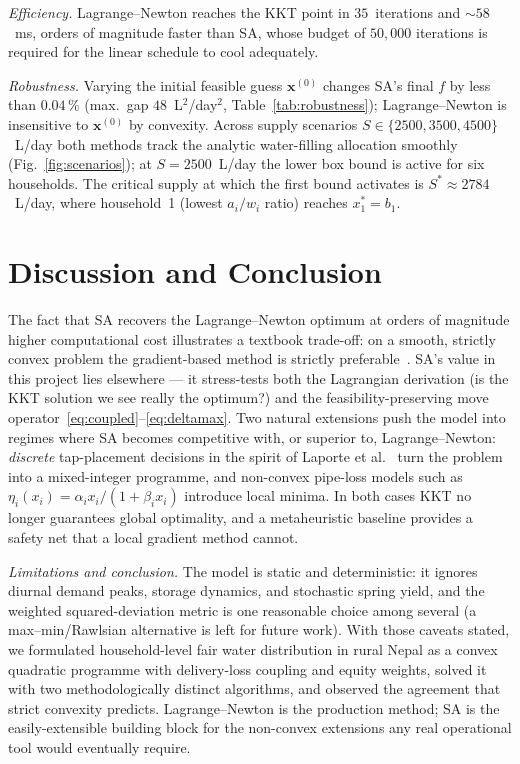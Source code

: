 \emph{Efficiency.}
Lagrange--Newton reaches the KKT point in $35$~iterations
and ${\sim}58$~\si{\milli\second}, orders of magnitude faster
than SA, whose budget of $50{,}000$ iterations is required for
the linear schedule to cool adequately.

\emph{Robustness.}
Varying the initial feasible guess $\mathbf{x}^{(0)}$ changes
SA's final $f$ by less than $0.04\,\%$ (max.\ gap $48$~L$^2$/day$^2$,
Table~\ref{tab:robustness}); Lagrange--Newton is
insensitive to $\mathbf{x}^{(0)}$ by convexity. Across supply
scenarios $S \in \{2500, 3500, 4500\}$~L/day both methods track
the analytic water-filling allocation smoothly
(Fig.~\ref{fig:scenarios}); at $S=2500$~\si{L/day} the lower box bound
is active for six households. The critical supply at which
the first bound activates is $S^* \approx 2784$~\si{L/day}, where
household~1 (lowest $a_i/w_i$ ratio) reaches $x_1^* = b_1$.

\section{Discussion and Conclusion}
\label{sec:discussion}

The fact that SA recovers the Lagrange--Newton optimum at
orders of magnitude higher computational cost illustrates a
textbook trade-off: on a smooth, strictly convex problem the
gradient-based method is strictly preferable~\citep{nocedal2006}.
SA's value in this project lies elsewhere --- it stress-tests
both the Lagrangian derivation (is the KKT solution we see
really the optimum?) and the feasibility-preserving move
operator~\eqref{eq:coupled}--\eqref{eq:deltamax}. Two natural
extensions push the model into regimes where SA becomes
competitive with, or superior to, Lagrange--Newton: \emph{discrete}
tap-placement decisions in the spirit of Laporte et al.~\cite{laporte2022}
turn the problem into a mixed-integer programme, and non-convex
pipe-loss models such as $\eta_i(x_i) = \alpha_i x_i / (1 +
\beta_i x_i)$ introduce local minima. In both cases KKT no
longer guarantees global optimality, and a metaheuristic
baseline provides a safety net that a local gradient method
cannot.

\emph{Limitations and conclusion.}
The model is static and deterministic: it ignores diurnal demand
peaks, storage dynamics, and stochastic spring yield, and the
weighted squared-deviation metric is one reasonable choice among
several (a max--min/Rawlsian alternative is left for future
work). With those caveats stated, we formulated household-level
fair water distribution in rural Nepal as a convex quadratic
programme with delivery-loss coupling and equity weights, solved
it with two methodologically distinct algorithms, and observed
the agreement that strict convexity predicts. Lagrange--Newton
is the production method; SA is the easily-extensible building
block for the non-convex extensions any real operational tool
would eventually require.
